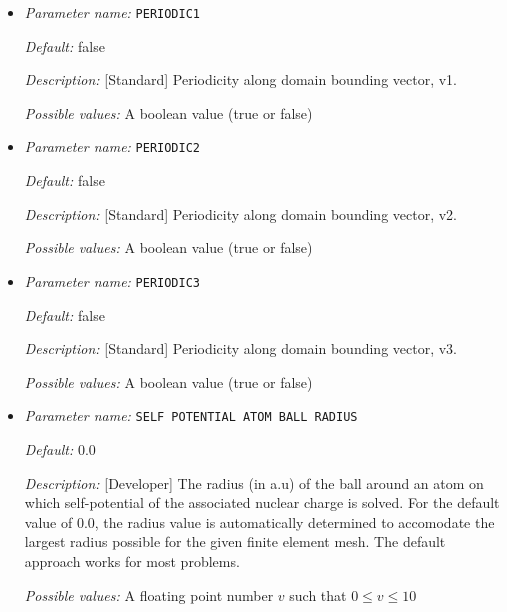\begin{itemize}
\item {\it Parameter name:} {\tt PERIODIC1}
\label{parameters:Boundary conditions/PERIODIC1}
\label{parameters:Boundary_20conditions/PERIODIC1}




{\it Default:} false


{\it Description:} [Standard] Periodicity along domain bounding vector, v1.


{\it Possible values:} A boolean value (true or false)
\item {\it Parameter name:} {\tt PERIODIC2}
\label{parameters:Boundary conditions/PERIODIC2}
\label{parameters:Boundary_20conditions/PERIODIC2}




{\it Default:} false


{\it Description:} [Standard] Periodicity along domain bounding vector, v2.


{\it Possible values:} A boolean value (true or false)
\item {\it Parameter name:} {\tt PERIODIC3}
\label{parameters:Boundary conditions/PERIODIC3}
\label{parameters:Boundary_20conditions/PERIODIC3}




{\it Default:} false


{\it Description:} [Standard] Periodicity along domain bounding vector, v3.


{\it Possible values:} A boolean value (true or false)
\item {\it Parameter name:} {\tt SELF POTENTIAL ATOM BALL RADIUS}
\label{parameters:Boundary conditions/SELF POTENTIAL ATOM BALL RADIUS}
\label{parameters:Boundary_20conditions/SELF_20POTENTIAL_20ATOM_20BALL_20RADIUS}




{\it Default:} 0.0


{\it Description:} [Developer] The radius (in a.u) of the ball around an atom on which self-potential of the associated nuclear charge is solved. For the default value of 0.0, the radius value is automatically determined to accomodate the largest radius possible for the given finite element mesh. The default approach works for most problems.


{\it Possible values:} A floating point number $v$ such that $0 \leq v \leq 10$
\end{itemize}

